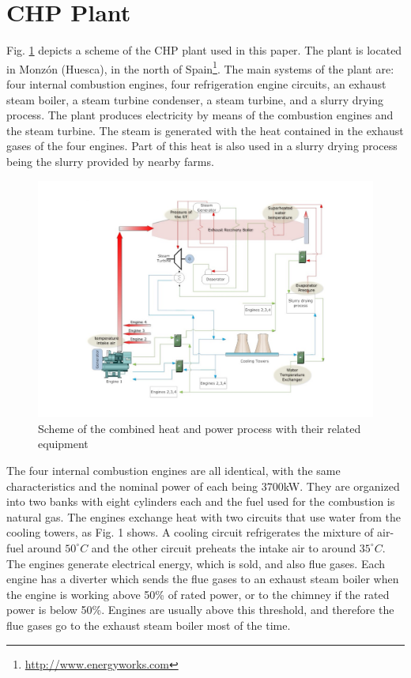 \section{CHP Plant}
\label{plant}

Fig. \ref{figplant} depicts a scheme of the CHP plant used in this paper. The plant is located in Monz\'on (Huesca), in the north of Spain\footnote{\url{http://www.energyworks.com}}. The main systems of the plant are: four internal combustion engines, four refrigeration engine circuits, an exhaust steam boiler, a steam turbine condenser, a steam turbine, and a slurry drying process. The plant produces electricity by means of the combustion engines and the steam turbine. The steam is generated with the heat contained in the exhaust gases of the four engines. Part of this heat is also used in a slurry drying process being the slurry provided by nearby farms.
\begin{figure}
\includegraphics[width=1\textwidth]{plant.pdf}
\caption{Scheme of the combined heat and power process with their related equipment}
\label{figplant}
\end{figure}

The four internal combustion engines are all identical, with the same characteristics and the nominal power of each being 3700kW. They are organized into two banks with eight cylinders each and the fuel used for the combustion is natural gas. The engines exchange heat with two circuits that use water from the cooling towers, as Fig. 1 shows. A cooling circuit refrigerates the mixture of air-fuel around $50^{\circ}C$ and the other circuit preheats the intake air to around $35^{\circ}C$. The engines generate electrical energy, which is sold,  and also flue gases. Each engine has a diverter which sends the flue gases to an exhaust steam boiler when the engine is working above 50\% of rated power, or to the chimney if the rated power is below 50\%. Engines are usually above this threshold, and therefore the flue gases go to the exhaust steam boiler most of the time. 

